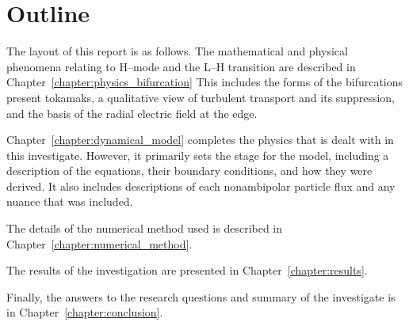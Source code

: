 \section{Outline}\label{sec:outline}
The layout of this report is as follows.
The mathematical and physical phenomena relating to H--mode and the L--H transition are described in Chapter~\ref{chapter:physics_bifurcation}
This includes the forms of the bifurcations present tokamaks, a qualitative view of turbulent transport and its suppression, and the basis of the radial electric field at the edge.

Chapter~\ref{chapter:dynamical_model} completes the physics that is dealt with in this investigate.
However, it primarily sets the stage for the model, including a description of the equations, their boundary conditions, and how they were derived.
It also includes descriptions of each nonambipolar particle flux and any nuance that was included.

The details of the numerical method used is described in Chapter~\ref{chapter:numerical_method}.

The results of the investigation are presented in Chapter~\ref{chapter:results}.

Finally, the answers to the research questions and summary of the investigate is in Chapter~\ref{chapter:conclusion}.

